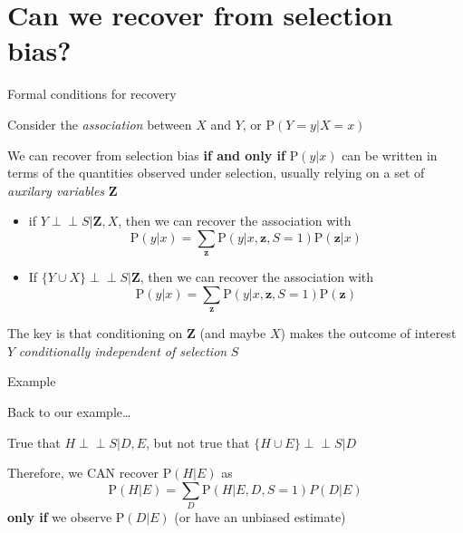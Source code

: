 \documentclass[
  ignorenonframetext,
]{beamer}
\providecommand{\tightlist}{%
  \setlength{\itemsep}{0pt}\setlength{\parskip}{0pt}}
\newcommand\ci{\perp\!\!\!\perp}
\begin{document}
\hypertarget{can-we-recover-from-selection-bias}{%
\section{Can we recover from selection
bias?}\label{can-we-recover-from-selection-bias}}

\begin{frame}{Formal conditions for recovery}
\protect\hypertarget{formal-conditions-for-recovery}{}

Consider the \emph{association} between \(X\) and \(Y\), or
\(\text{P}(Y = y|X = x)\)

We can recover from selection bias \textbf{if and only if}
\(\text{P}(y|x)\) can be written in terms of the quantities observed
under selection, usually relying on a set of \emph{auxilary variables}
\(\mathbf{Z}\)

\begin{itemize}
\tightlist
\item
  if \(Y \ci S | {\mathbf{Z}, X}\), then we can recover the association
  with
  \[\text{P}(y|x) = \sum_\mathbf{z} \text{P}(y|x, \mathbf{z}, S=1)\text{P}(\mathbf{z}|x)\]
\item
  If \(\{Y \cup X\} \ci S | \mathbf{Z}\), then we can recover the
  association with
  \[\text{P}(y|x) = \sum_\mathbf{z} \text{P}(y|x, \mathbf{z}, S=1)\text{P}(\mathbf{z})\]
\end{itemize}

The key is that conditioning on \(\mathbf{Z}\) (and maybe \(X\)) makes
the outcome of interest \(Y\) \emph{conditionally independent of
selection} \(S\)

\end{frame}

\begin{frame}{Example}
\protect\hypertarget{example}{}

Back to our example\ldots{}

\begin{figure}
\centering
{}
\end{figure}

True that \(H \ci S | D, E\), but not true that
\(\{H \cup E\} \ci S | D\)

Therefore, we CAN recover \(\text{P}(H | E)\) as
\[\text{P}(H | E) = \sum_D\text{P}(H | E, D, S = 1) P (D|E)\]
\textbf{only if} we observe \(\text{P}(D | E)\) (or have an unbiased
estimate)

\end{frame}
\end{document}
